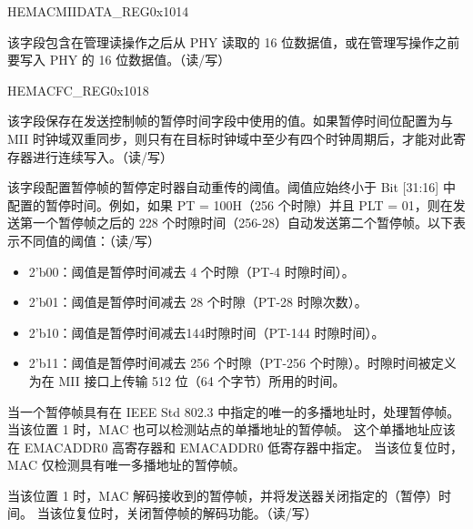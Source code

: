\begin{register}{H}{EMACMIIDATA\_REG}{0x1014}\label{regdesc:EMACMIIDATAREG}
%
%
\regnewline%
\begin{regdesc}\begin{reglist}
\item [MII\_DATA]该字段包含在管理读操作之后从 PHY 读取的 16 位数据值，或在管理写操作之前要写入 PHY 的 16 位数据值。（读/写）
\end{reglist}\end{regdesc}
\end{register}


\begin{register}{H}{EMACFC\_REG}{0x1018}\label{regdesc:EMACFLOWCONTROLREG}
%
%
%
%
%
%
%
\regnewline%
\begin{regdesc}\begin{reglist}
\item [PAUSE\_TIME] 该字段保存在发送控制帧的暂停时间字段中使用的值。如果暂停时间位配置为与 MII 时钟域双重同步，则只有在目标时钟域中至少有四个时钟周期后，才能对此寄存器进行连续写入。（读/写）
\item [PLT]该字段配置暂停帧的暂停定时器自动重传的阈值。阈值应始终小于 Bit [31:16] 中配置的暂停时间。例如，如果 PT = 100H（256 个时隙）并且 PLT = 01，则在发送第一个暂停帧之后的 228 个时隙时间（256-28）自动发送第二个暂停帧。以下表示不同值的阈值：（读/写）
\begin{itemize}
\item 2'b00：阈值是暂停时间减去 4 个时隙（PT-4 时隙时间）。 \item 2'b01：阈值是暂停时间减去 28 个时隙（PT-28 时隙次数）。 \item 2'b10：阈值是暂停时间减去144时隙时间（PT-144 时隙时间）。 \item 2'b11：阈值是暂停时间减去 256 个时隙（PT-256 个时隙）。时隙时间被定义为在 MII 接口上传输 512 位（64 个字节）所用的时间。\end{itemize}
\item [UPFD] 当一个暂停帧具有在 IEEE Std 802.3 中指定的唯一的多播地址时，处理暂停帧。当该位置 1 时，MAC 也可以检测站点的单播地址的暂停帧。 这个单播地址应该在 EMACADDR0 高寄存器和 EMACADDR0 低寄存器中指定。 当该位复位时，MAC 仅检测具有唯一多播地址的暂停帧。
\item [RFCE]当该位置 1 时，MAC 解码接收到的暂停帧，并将发送器关闭指定的（暂停）时间。 当该位复位时，关闭暂停帧的解码功能。（读/写）

\end{reglist}
\end{regdesc}
\end{register}
